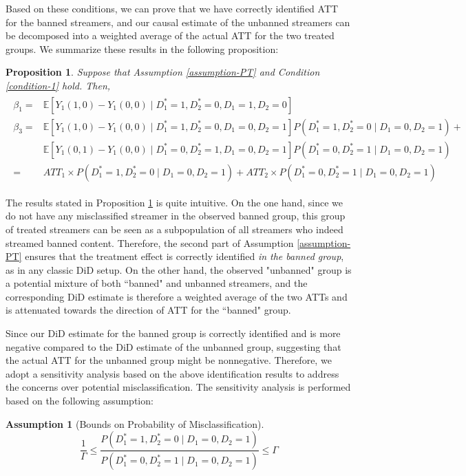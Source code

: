 \documentclass[a4paper,12pt]{article}
\newtheorem{proposition}{Proposition}
\newtheorem{assumption}{Assumption}
\begin{document}
Based on these conditions, we can prove that we have correctly identified ATT for the banned streamers, and our causal estimate of the unbanned streamers can be decomposed into a weighted average of the actual ATT for the two treated groups. We summarize these results in the following proposition:

\begin{proposition}\label{prop-2}
Suppose that Assumption \ref{assumption-PT} and Condition \ref{condition-1} hold. Then,
    \begin{align}
    \begin{split}
    \beta_{1} = &\mathbb{E}[Y_1(1,0)-Y_1(0,0) \mid D_1^\ast=1, D_2^\ast=0,D_1=1,D_2=0]\\ \label{prop-decomposition}
    \beta_{3} = &\mathbb{E}[Y_1(1,0)-Y_1(0,0) \mid D_1^\ast=1, D_2^\ast=0,D_1=0,D_2=1]P(D_1^\ast=1,D_2^\ast=0 \mid D_1=0,D_2=1) +\\
    &\mathbb{E}[Y_1(0,1)-Y_1(0,0) \mid D_1^\ast=0, D_2^\ast=1,D_1=0,D_2=1]P(D_1^\ast=0,D_2^\ast=1 \mid D_1=0,D_2=1)\\
    = & ATT_1 \times P(D_1^\ast=1,D_2^\ast=0 \mid D_1=0, D_2=1) + ATT_2 \times P(D_1^\ast=0,D_2^\ast=1 \mid D_1=0, D_2=1)
    \end{split}
    \end{align}
\end{proposition}

The results stated in Proposition \ref{prop-2} is quite intuitive. On the one hand, since we do not have any misclassified streamer in the observed banned group, this group of treated streamers can be seen as a subpopulation of all streamers who indeed streamed banned content. Therefore, the second part of Assumption \ref{assumption-PT} ensures that the treatment effect is correctly identified \textit{in the banned group}, as in any classic DiD setup. On the other hand, the observed "unbanned" group is a potential mixture of both ``banned" and unbanned streamers, and the corresponding DiD estimate is therefore a weighted average of the two ATTs and is attenuated towards the direction of ATT for the ``banned" group. 

Since our DiD estimate for the banned group is correctly identified and is more negative compared to the DiD estimate of the unbanned group, suggesting that the actual ATT for the unbanned group might be nonnegative. Therefore, we adopt a sensitivity analysis based on the above identification results to address the concerns over potential misclassification. The sensitivity analysis is performed based on the following assumption:
\begin{assumption}[Bounds on Probability of Misclassification]\label{assumption-2}
    \begin{equation*}
        \frac{1}{\Gamma} \leq \frac{P(D_1^\ast=1, D_2^\ast = 0 \mid D_1=0,D_2=1)}{P(D_1^\ast=0, D_2^\ast = 1 \mid D_1=0,D_2=1)} \leq \Gamma
    \end{equation*}
\end{assumption}
\end{document}

